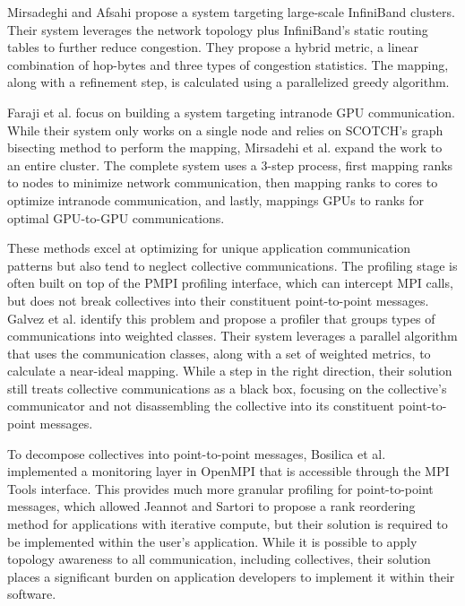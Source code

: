 Mirsadeghi and Afsahi \cite{Mirsadeghi2016PTRAM} propose a system targeting large-scale InfiniBand clusters.
Their system leverages the network topology plus InfiniBand's static routing tables to further reduce congestion.
They propose a hybrid metric, a linear combination of hop-bytes and three types of congestion statistics. 
The mapping, along with a refinement step, is calculated using a parallelized greedy algorithm.

Faraji et al. \cite{Faraji2016TopoAwareGPUSelection} focus on building a system targeting intranode \gls{GPU} communication.
While their system only works on a single node and relies on SCOTCH's \cite{Pellegrini2012SCOTCH} graph bisecting method to perform the mapping, Mirsadehi et al. \cite{Mirsadeghi2016MAGC} expand the work to an entire cluster.
The complete system uses a 3-step process, first mapping ranks to nodes to minimize network communication, then mapping ranks to cores to optimize intranode communication, and lastly, mappings \gls{GPU}s to ranks for optimal \gls{GPU}-to-\gls{GPU} communications.

These methods excel at optimizing for unique application communication patterns but also tend to neglect collective communications.
The profiling stage is often built on top of the PMPI profiling interface, which can intercept \gls{MPI} calls, but does not break collectives into their constituent point-to-point messages.
Galvez et al. \cite{Galvez2017AutoTopoMap} identify this problem and propose a profiler that groups types of communications into weighted classes.
Their system leverages a parallel algorithm that uses the communication classes, along with a set of weighted metrics, to calculate a near-ideal mapping.
While a step in the right direction, their solution still treats collective communications as a black box, focusing on the collective's communicator and not disassembling the collective into its constituent point-to-point messages.

To decompose collectives into point-to-point messages, Bosilica et al. \cite{Bosilica2017OnlineMonitoringMPI} implemented a monitoring layer in OpenMPI that is accessible through the \gls{MPI} Tools interface.
This provides much more granular profiling for point-to-point messages, which allowed Jeannot and Sartori \cite{Jeannot2020ImprvMPICommMonitoring} to propose a rank reordering method for applications with iterative compute, but their solution is required to be implemented within the user's application. 
While it is possible to apply topology awareness to all communication, including collectives, their solution places a significant burden on application developers to implement it within their software.

